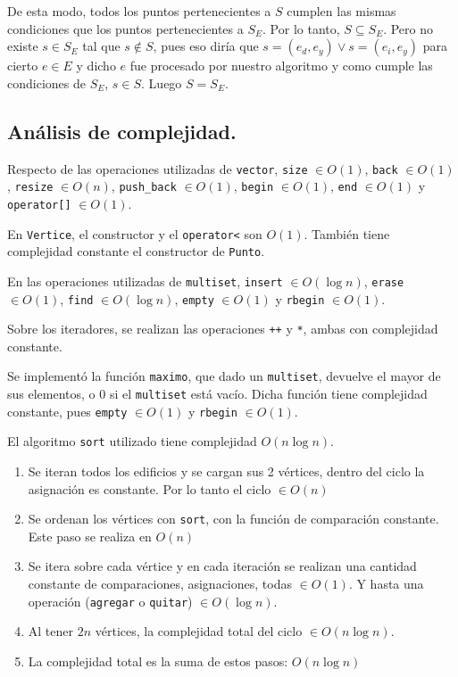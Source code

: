 De esta modo, todos los puntos pertenecientes a $S$ cumplen las mismas
condiciones que los puntos pertenecientes a $S_E$. Por lo tanto, $S
\subseteq S_E$. Pero no existe $s \in S_E$ tal que $s \notin S$, pues eso
diría que $s = (e_d, e_y) \lor s = (e_i, e_y)$ para cierto $e \in E$ y dicho
$e$ fue procesado por nuestro algoritmo y como cumple las condiciones de
$S_E$, $s \in S$. Luego $S = S_E$.


\subsection{Análisis de complejidad.}

\vspace*{0.3cm}

Respecto de las operaciones utilizadas de \verb|vector|, \verb|size| $\in O(1)$,
\verb|back| $\in O(1)$, \verb|resize| $\in O(n)$, \verb|push_back| $\in O(1)$,
\verb|begin| $\in O(1)$, \verb|end| $\in O(1)$ y \verb|operator[]| $\in O(1)$.

\noindent
En \verb|Vertice|, el constructor y el \verb|operator<| son $O(1)$. También
tiene complejidad constante el constructor de \verb|Punto|.

\noindent
En las operaciones utilizadas de \verb|multiset|, \verb|insert| $\in O(\log n)$,
\verb|erase| $\in O(1)$, \verb|find| $\in O(\log n)$, \verb|empty| $\in O(1)$ y
\verb|rbegin| $\in O(1)$.

\noindent
Sobre los iteradores, se realizan las operaciones \verb|++| y \verb|*|, ambas
con complejidad constante.

\noindent
Se implementó la función \verb|maximo|, que dado un \verb|multiset|, devuelve
el mayor de sus elementos, o 0 si el \verb|multiset| está vacío. Dicha función
tiene complejidad constante, pues \verb|empty| $\in O(1)$ y \verb|rbegin| $\in O(1)$.

\noindent
El algoritmo \verb|sort| utilizado tiene complejidad $O(n \log n)$.

\noindent

\begin{enumerate}
  \item Se iteran todos los edificios y se cargan sus 2 vértices, dentro
  del ciclo la asignación es constante. Por lo tanto el ciclo $\in O(n)$

  \item Se ordenan los vértices con \verb|sort|, con la función de comparación
  constante. Este paso se realiza en $O(n)$

  \item Se itera sobre cada vértice y en cada iteración se realizan una cantidad
  constante de comparaciones, asignaciones, todas $\in O(1)$. Y hasta una operación
  (\verb|agregar| o \verb|quitar|) $\in O(\log n)$.

  \item Al tener $2n$ vértices, la complejidad total del ciclo $\in O(n \log n)$.

  \item La complejidad total es la suma de estos pasos: $O(n \log n)$
\end{enumerate}


